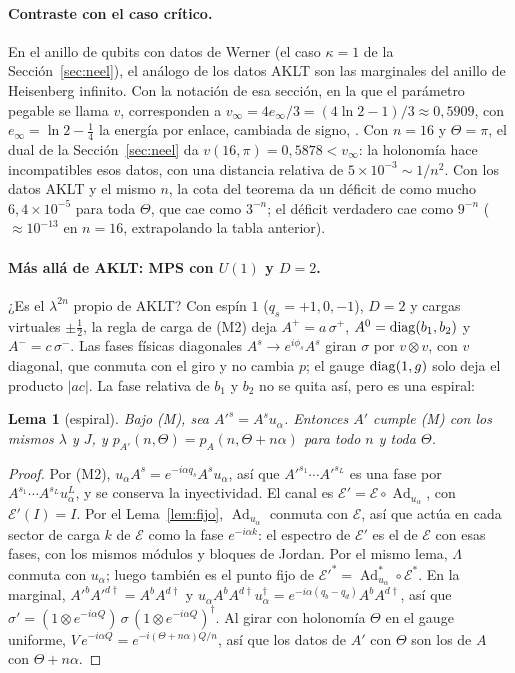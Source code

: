 \documentclass[11pt,a4paper]{article}
\newtheorem{lema}[teorema]{Lema}
\theoremstyle{remark}
\newcommand{\Ad}{\operatorname{Ad}}
\begin{document}
\paragraph{Contraste con el caso crítico.} En el anillo de qubits con datos de Werner (el caso
$\kappa=1$ de la Sección~\ref{sec:neel}), el análogo de los datos AKLT son las marginales del anillo
de Heisenberg infinito. Con la notación de esa sección, en la que el parámetro pegable se llama $v$,
corresponden a $v_\infty=4e_\infty/3=(4\ln2-1)/3\approx0{,}5909$, con
$e_\infty=\ln2-\tfrac14$ la energía por enlace, cambiada de signo, \cite{hulthen}. Con $n=16$ y
$\Theta=\pi$, el dual de la Sección~\ref{sec:neel} da $v(16,\pi)=0{,}5878<v_\infty$: la holonomía
hace incompatibles esos datos, con una distancia relativa de $5\times10^{-3}\sim1/n^2$. Con los datos AKLT y el mismo $n$, la cota del teorema da un déficit
de como mucho $6{,}4\times10^{-5}$ para toda $\Theta$, que cae como $3^{-n}$; el déficit verdadero
cae como $9^{-n}$ ($\approx10^{-13}$ en $n=16$, extrapolando la tabla anterior).

\paragraph{Más allá de AKLT: MPS con $U(1)$ y $D=2$.} ¿Es el $\lambda^{2n}$ propio de AKLT? Con
espín $1$ ($q_s=+1,0,-1$), $D=2$ y cargas virtuales $\pm\tfrac12$, la regla de carga de (M2)
deja $A^+=a\,\sigma^+$, $A^0={\rm diag}(b_1,b_2)$ y $A^-=c\,\sigma^-$. Las fases físicas
diagonales $A^s\to e^{i\phi_s}A^s$ giran $\sigma$ por $v\otimes v$, con $v$ diagonal, que conmuta
con el giro y no cambia $p$; el gauge ${\rm diag}(1,g)$ solo deja el producto $|ac|$. La fase
relativa de $b_1$ y $b_2$ no se quita así, pero es una espiral:

\begin{lema}[espiral]\label{lem:espiral}
Bajo (M), sea $A'^s=A^su_\alpha$. Entonces $A'$ cumple (M) con los mismos $\lambda$ y $J$, y
$p_{A'}(n,\Theta)=p_A(n,\Theta+n\alpha)$ para todo $n$ y toda $\Theta$.
\end{lema}

\begin{proof}
Por (M2), $u_\alpha A^s=e^{-i\alpha q_s}A^su_\alpha$, así que $A'^{s_1}\cdots A'^{s_L}$ es una
fase por $A^{s_1}\cdots A^{s_L}u_\alpha^L$, y se conserva la inyectividad. El canal es
$\mathcal E'=\mathcal E\circ\Ad_{u_\alpha}$, con $\mathcal E'(I)=I$. Por el Lema~\ref{lem:fijo},
$\Ad_{u_\alpha}$ conmuta con $\mathcal E$, así que actúa en cada sector de carga $k$ de
$\mathcal E$ como la fase $e^{-i\alpha k}$: el espectro de $\mathcal E'$ es el de $\mathcal E$ con
esas fases, con los mismos módulos y bloques de Jordan. Por el mismo lema, $\Lambda$ conmuta con
$u_\alpha$; luego también es el punto fijo de
$\mathcal E'^*=\Ad_{u_\alpha}^*\circ\mathcal E^*$. En la marginal,
$A'^bA'^{d\dagger}=A^bA^{d\dagger}$ y
$u_\alpha A^bA^{d\dagger}u_\alpha^\dagger=e^{-i\alpha(q_b-q_d)}A^bA^{d\dagger}$, así que
$\sigma'=(1\otimes e^{-i\alpha Q})\,\sigma\,(1\otimes e^{-i\alpha Q})^\dagger$. Al girar con
holonomía $\Theta$ en el gauge uniforme, $V\,e^{-i\alpha Q}=e^{-i(\Theta+n\alpha)Q/n}$, así que los
datos de $A'$ con $\Theta$ son los de $A$ con $\Theta+n\alpha$.
\end{proof}
\end{document}
